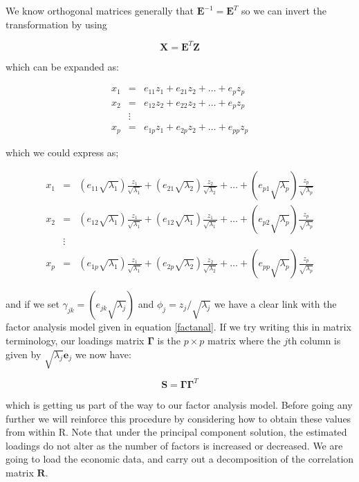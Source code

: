 We know orthogonal matrices generally that $\boldsymbol{E}^{-1} = \boldsymbol{E}^{T}$ so we can invert the transformation by using

\begin{equation}
\boldsymbol{X} = \boldsymbol{E}^{T} \boldsymbol{Z}
\end{equation}

which can be expanded as:

\begin{eqnarray*}
x_{1} &=& e_{11}z_{1} + e_{21} z_{2}  + \ldots + e_{p} z_{p}  \\
x_{2} &=& e_{12}z_{2} + e_{22} z_{2} + \ldots + e_{p} z_{p}  \\
&\vdots& \\
x_{p} &=& e_{1p}z_{1} + e_{2p} z_{2} + \ldots + e_{pp} z_{p}  
\end{eqnarray*}

which we could express as;

\begin{eqnarray*}
x_{1} &=& (e_{11} \sqrt{\lambda_{1}}) \frac{z_{1}}{\sqrt{\lambda_{1}}} + (e_{21} \sqrt{\lambda_{2}}) \frac{z_{2}}{\sqrt{\lambda_{2}}} + \ldots +  (e_{p1} \sqrt{\lambda_{p}}) \frac{z_{p}}{\sqrt{\lambda_{p}}} \\
x_{2} &=& (e_{12} \sqrt{\lambda_{1}}) \frac{z_{1}}{\sqrt{\lambda_{1}}} + (e_{12} \sqrt{\lambda_{1}}) \frac{z_{1}}{\sqrt{\lambda_{1}}} + \ldots +  (e_{p2} \sqrt{\lambda_{p}}) \frac{z_{p}}{\sqrt{\lambda_{p}}} \\
&\vdots& \\
x_{p} &=& (e_{1p} \sqrt{\lambda_{1}}) \frac{z_{1}}{\sqrt{\lambda_{1}}} + (e_{2p} \sqrt{\lambda_{2}}) \frac{z_{2}}{\sqrt{\lambda_{2}}} + \ldots +  (e_{pp} \sqrt{\lambda_{p}}) \frac{z_{p}}{\sqrt{\lambda_{p}}} 
\end{eqnarray*}

and if we set $\gamma_{jk} = (e_{jk} \sqrt{\lambda_{j}})$ and $\phi_{j} = z_{j} / \sqrt{\lambda_{j}}$ we have a clear link with the factor analysis model given in equation \ref{factanal}.   If we try writing this in matrix terminology, our loadings matrix $\boldsymbol{\Gamma}$ is the $p \times p$ matrix where the $j$th column is given by  $\sqrt{\lambda_{j}} \boldsymbol{e}_{j}$ we now have:

\begin{displaymath}
\boldsymbol{S} = \boldsymbol{\Gamma} \boldsymbol{\Gamma}^{T}
\end{displaymath}

which is getting us part of the way to our factor analysis model.   Before going any further we will reinforce this procedure by considering how to obtain these values from within R.  Note that under the principal component solution, the estimated loadings do not alter as the number of factors is increased or decreased. We are going to load the economic data, and carry out a decomposition of the correlation matrix $\boldsymbol{R}$.

